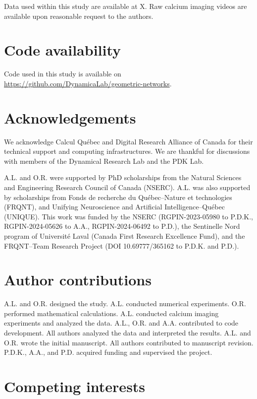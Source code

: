 \documentclass{article}
\begin{document}
Data used within this study are available at X. Raw calcium imaging videos are available upon reasonable request to the authors.

\section*{Code availability}

Code used in this study is available on \url{https://github.com/DynamicaLab/geometric-networks}.




\section*{Acknowledgements}

We acknowledge Calcul Québec and Digital Research Alliance of Canada for their technical support and computing infrastructures. We are thankful for discussions with members of the Dynamical Research Lab and the PDK Lab.

A.L. and O.R. were supported by PhD scholarships from the Natural Sciences and Engineering Research Council of Canada (NSERC). A.L. was also supported by scholarships from Fonds de recherche du Québec--Nature et technologies
(FRQNT), and Unifying Neuroscience and Artificial Intelligence–Québec (UNIQUE). This work was funded by the NSERC (RGPIN-2023-05980 to P.D.K., RGPIN-2024-05626 to A.A., RGPIN-2024-06492 to P.D.), the
Sentinelle Nord program of Université Laval (Canada First Research Excellence Fund), and the FRQNT--Team Research Project (DOI 10.69777/365162 to P.D.K. and P.D.).

\section*{Author contributions}

A.L. and O.R. designed the study. A.L. conducted numerical experiments. O.R. performed mathematical calculations. A.L. conducted calcium imaging experiments and analyzed the data. A.L., O.R. and A.A. contributed to code development. All authors analyzed the data and interpreted the results. A.L. and O.R. wrote the initial manuscript. All authors contributed to manuscript revision. P.D.K., A.A., and P.D. acquired funding and supervised the project.

\section*{Competing interests}
\end{document}
